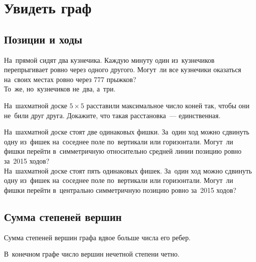 
\section*{Увидеть граф}



\subsection*{Позиции и ходы}

\begin{problems}

\item
\subproblem
На~прямой сидят два кузнечика.
Каждую минуту один из~кузнечиков перепрыгивает ровно через одного другого.
Могут~ли все кузнечики оказаться на~своих местах ровно через 777 прыжков?
\\
\subproblem
То~же, но~кузнечиков не~два, а~три.

\item
На~шахматной доске $5 \times 5$ расставили максимальное число коней так, чтобы
они не~били друг друга.
Докажите, что такая расстановка~--- единственная.

\item
\subproblem
На~шахматной доске стоят две одинаковых фишки.
За~один ход можно сдвинуть одну из~фишек на~соседнее поле по~вертикали или
горизонтали.
Могут~ли фишки перейти в~симметричную относительно средней линии позицию ровно
за~2015 ходов?
\\
\subproblem
На~шахматной доске стоят пять одинаковых фишек.
За~один ход можно сдвинуть одну из~фишек на~соседнее поле по~вертикали или
горизонтали.
Могут~ли фишки перейти в~центрально симметричную позицию ровно за~2015 ходов?

\end{problems}

\subsection*{Сумма степеней вершин}

Сумма степеней вершин графа вдвое больше числа его ребер.

В~конечном графе число вершин нечетной степени четно. 


